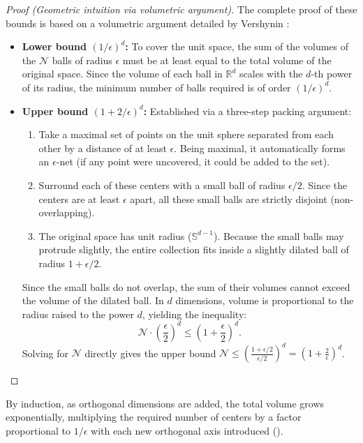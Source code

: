 \documentclass[11pt, oneside, openany]{book}
\begin{document}
\begin{proof}[Proof (Geometric intuition via volumetric argument)]
The complete proof of these bounds is based on a volumetric argument detailed by Vershynin \cite{vershynin2018high}:
\begin{itemize}
    \item \textbf{Lower bound $(1/\epsilon)^{d}$:} To cover the unit space, the sum of the volumes of the $\mathcal{N}$ balls of radius $\epsilon$ must be at least equal to the total volume of the original space. Since the volume of each ball in $\mathbb{R}^{d}$ scales with the $d$-th power of its radius, the minimum number of balls required is of order $(1/\epsilon)^{d}$.
    \item \textbf{Upper bound $(1 + 2/\epsilon)^{d}$:} Established via a three-step packing argument:
    \begin{enumerate}
        \item Take a maximal set of points on the unit sphere separated from each other by a distance of at least $\epsilon$. Being maximal, it automatically forms an $\epsilon$-net (if any point were uncovered, it could be added to the set).
        \item Surround each of these centers with a small ball of radius $\epsilon/2$. Since the centers are at least $\epsilon$ apart, all these small balls are strictly disjoint (non-overlapping).
        \item The original space has unit radius ($\mathbb{S}^{d-1}$). Because the small balls may protrude slightly, the entire collection fits inside a slightly dilated ball of radius $1 + \epsilon/2$.
    \end{enumerate}
    Since the small balls do not overlap, the sum of their volumes cannot exceed the volume of the dilated ball. In $d$ dimensions, volume is proportional to the radius raised to the power $d$, yielding the inequality:
    \[
        \mathcal{N} \cdot \left(\frac{\epsilon}{2}\right)^{d} \leq \left(1 + \frac{\epsilon}{2}\right)^{d}.
    \]
    Solving for $\mathcal{N}$ directly gives the upper bound $\mathcal{N} \leq \left( \frac{1 + \epsilon/2}{\epsilon/2} \right)^{d} = \left( 1 + \frac{2}{\epsilon} \right)^{d}$.
\end{itemize}
\end{proof}

By induction, as orthogonal dimensions are added, the total volume grows exponentially, multiplying the required number of centers by a factor proportional to $1/\epsilon$ with each new orthogonal axis introduced ().
\end{document}
